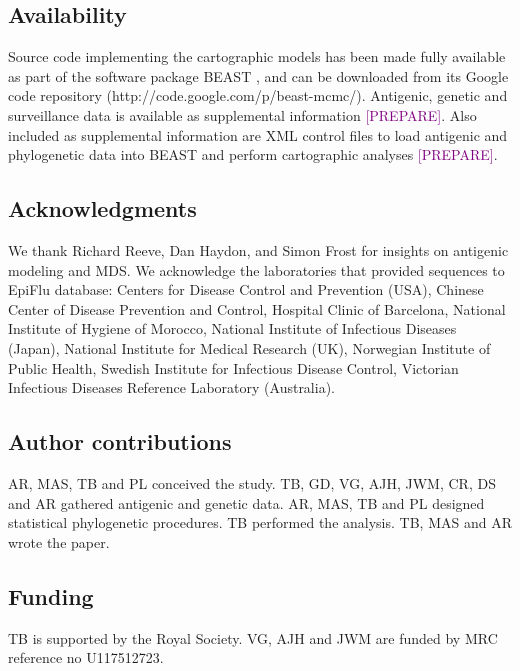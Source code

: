 \documentclass[11pt,oneside,letterpaper]{article}
\def\tbc#1{\textcolor{purple}{[#1]}}
\begin{document}
\subsection*{Availability}

Source code implementing the cartographic models has been made fully available as part of the software package BEAST \cite{BEAST, BEAST17}, and can be downloaded from its Google code repository (http://code.google.com/p/beast-mcmc/).
Antigenic, genetic and surveillance data is available as supplemental information \tbc{PREPARE}.
Also included as supplemental information are XML control files to load antigenic and phylogenetic data into BEAST and perform cartographic analyses \tbc{PREPARE}.

\subsection*{Acknowledgments} 

We thank Richard Reeve, Dan Haydon, and Simon Frost for insights on antigenic modeling and MDS.
We acknowledge the laboratories that provided sequences to EpiFlu database: Centers for Disease Control and Prevention (USA), Chinese Center of Disease Prevention and Control, Hospital Clinic of Barcelona, National Institute of Hygiene of Morocco, National Institute of Infectious Diseases (Japan), National Institute for Medical Research (UK), Norwegian Institute of Public Health, Swedish Institute for Infectious Disease Control, Victorian Infectious Diseases Reference Laboratory (Australia).

\subsection*{Author contributions} 

AR, MAS, TB and PL conceived the study.
TB, GD, VG, AJH, JWM, CR, DS and AR gathered antigenic and genetic data.
AR, MAS, TB and PL designed statistical phylogenetic procedures.
TB performed the analysis.
TB, MAS and AR wrote the paper.

\subsection*{Funding} 

TB is supported by the Royal Society. 
VG, AJH and JWM are funded by MRC reference no U117512723.






\end{document}
